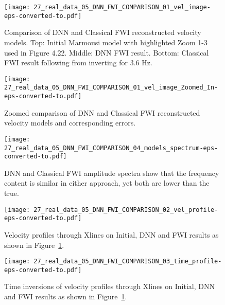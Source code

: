 \begin{figure}[ht!]
    \centering
    \texttt{[image: 27\_real\_data\_05\_DNN\_FWI\_COMPARISON\_01\_vel\_image-eps-converted-to.pdf]}
    \caption[Comparison of DNN and Classical FWI reconstructed velocity models.]{Comparison of DNN and Classical FWI reconstructed velocity models. Top: Initial Marmousi model with highlighted Zoom 1-3 used in Figure 4.22. Middle: DNN FWI result. Bottom: Classical FWI result following from inverting for 3.6 Hz.}
    \label{fig:comparison_dnn_fwi_image}
\end{figure}

\begin{figure}[ht!]
    \centering
    \texttt{[image: 27\_real\_data\_05\_DNN\_FWI\_COMPARISON\_01\_vel\_image\_Zoomed\_In-eps-converted-to.pdf]}
    \caption[Zoomed comparison of DNN and Classical FWI velocity and errors.]{Zoomed comparison of DNN and Classical FWI reconstructed velocity models and corresponding errors.}
    \label{fig:comparison_dnn_fwi_image_zoom}
\end{figure}

\begin{figure}[ht!]
    \centering
    \texttt{[image: 27\_real\_data\_05\_DNN\_FWI\_COMPARISON\_04\_models\_spectrum-eps-converted-to.pdf]}
    \caption[DNN and Classical FWI amplitude spectra.]{DNN and Classical FWI amplitude spectra show that the frequency content is similar in either approach, yet both are lower than the true.}
    \label{fig:comparison_dnn_fwi_spectra}
\end{figure}


\begin{figure}[ht!]
    \centering
    \texttt{[image: 27\_real\_data\_05\_DNN\_FWI\_COMPARISON\_02\_vel\_profile-eps-converted-to.pdf]}
    \caption[Velocity profiles through Xlines for Initial, DNN and FWI results.]{Velocity profiles through Xlines on Initial, DNN and FWI results as shown in Figure~\ref{fig:comparison_dnn_fwi_image}.}
    \label{fig:comparison_dnn_fwi_velocity}
\end{figure}

\begin{figure}[ht!]
    \centering
    \texttt{[image: 27\_real\_data\_05\_DNN\_FWI\_COMPARISON\_03\_time\_profile-eps-converted-to.pdf]}
    \caption[Time inversions of velocity for Initial, DNN and FWI results.]{Time inversions of velocity profiles through Xlines on Initial, DNN and FWI results as shown in Figure~\ref{fig:comparison_dnn_fwi_image}.}
    \label{fig:comparison_dnn_fwi_trace}
\end{figure}

